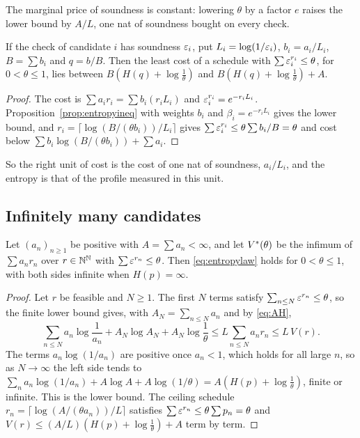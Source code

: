 The marginal price of soundness is constant: lowering $\theta$ by a factor $e$ raises the lower bound by $A/L$, one nat of soundness bought on every check.

\begin{corollary}\label{cor:hetero}
If the check of candidate $i$ has soundness $\varepsilon_{i}$, put $L_{i}=\log(1/\varepsilon_{i})$, $b_{i}=a_{i}/L_{i}$, $B=\sum b_{i}$ and $q=b/B$. Then the least cost of a schedule with $\sum\varepsilon_{i}^{r_{i}}\le\theta$, for $0<\theta\le1$, lies between $B(H(q)+\log\frac1\theta)$ and $B(H(q)+\log\frac1\theta)+A$.
\end{corollary}

\begin{proof}
The cost is $\sum a_{i}r_{i}=\sum b_{i}(r_{i}L_{i})$ and $\varepsilon_{i}^{r_{i}}=e^{-r_{i}L_{i}}$. Proposition~\ref{prop:entropyineq} with weights $b_{i}$ and $\beta_{i}=e^{-r_{i}L_{i}}$ gives the lower bound, and $r_{i}=\lceil\log(B/(\theta b_{i}))/L_{i}\rceil$ gives $\sum\varepsilon_{i}^{r_{i}}\le\theta\sum b_{i}/B=\theta$ and cost below $\sum b_{i}\log(B/(\theta b_{i}))+\sum a_{i}$.
\end{proof}

So the right unit of cost is the cost of one nat of soundness, $a_{i}/L_{i}$, and the entropy is that of the profile measured in this unit.

\subsection{Infinitely many candidates}

\begin{proposition}\label{prop:infinite}
Let $(a_{n})_{n\ge1}$ be positive with $A=\sum a_{n}<\infty$, and let $V^{*}(\theta)$ be the infimum of $\sum a_{n}r_{n}$ over $r\in\mathbb{N}^{\mathbb{N}}$ with $\sum\varepsilon^{r_{n}}\le\theta$. Then \eqref{eq:entropylaw} holds for $0<\theta\le1$, with both sides infinite when $H(p)=\infty$.
\end{proposition}

\begin{proof}
Let $r$ be feasible and $N\ge1$. The first $N$ terms satisfy $\sum_{n\le N}\varepsilon^{r_{n}}\le\theta$, so the finite lower bound gives, with $A_{N}=\sum_{n\le N}a_{n}$ and by \eqref{eq:AH},
\[
\sum_{n\le N}a_{n}\log\frac1{a_{n}}+A_{N}\log A_{N}+A_{N}\log\frac1\theta\le L\sum_{n\le N}a_{n}r_{n}\le L\,V(r).
\]
The terms $a_{n}\log(1/a_{n})$ are positive once $a_{n}<1$, which holds for all large $n$, so as $N\to\infty$ the left side tends to $\sum_{n}a_{n}\log(1/a_{n})+A\log A+A\log(1/\theta)=A(H(p)+\log\frac1\theta)$, finite or infinite. This is the lower bound. The ceiling schedule $r_{n}=\lceil\log(A/(\theta a_{n}))/L\rceil$ satisfies $\sum\varepsilon^{r_{n}}\le\theta\sum p_{n}=\theta$ and $V(r)\le(A/L)(H(p)+\log\frac1\theta)+A$ term by term.
\end{proof}

